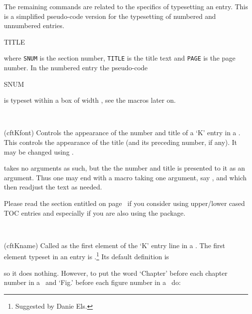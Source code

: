  The remaining commands are related to the specifics of typesetting
 an entry.
 This is a simplified pseudo-code version for the typesetting of numbered 
 and unnumbered entries.
 \begin{lcode}
 {}
         {\cftKleader}{}\cftKafterpnum\par

 {\cftKfont TITLE}{\cftKleader}{}\cftKafterpnum\par
 \end{lcode}
 where \texttt{SNUM} is the section number, \texttt{TITLE} is the title text 
and \texttt{PAGE} 
 is the page number. In the numbered entry the pseudo-code
\begin{lcode}
{\cftKpresnum SNUM\cftKaftersnum\hfil}
\end{lcode}
 is typeset within a box of width \lnc{\cftKnumwidth}, see the
  macros later on.

\begin{syntax}
\cmd{\cftKfont} \\
\end{syntax}
\glossary(cftKfont)%
{}%
{Controls the appearance of the number and title of a `K' entry in a \listofx.}
This controls the appearance of the title (and its preceding number, 
if any). It may be changed using \cmd{\renewcommand}. 

\cmd{\cftKfont} takes no arguments as such, but the the number and
title is presented to it as an argument. Thus one may end
\cmd{\cftKfont} with a macro taking one argument, say
\cmd{\MakeUppercase}, and which then readjust the text as needed.

\begin{caveat}
  Please read the section entitled
  \emph{} on
  page~\pageref{sec:about-upper-or} if you consider using upper/lower
  cased TOC entries and especially if you are also using the
   package.
\end{caveat}


\begin{syntax}
\cmd{\cftKname} \\
\end{syntax}
\glossary(cftKname)
  {}%
  {Called as the first element of the  `K' entry line in a \listofx.}
    The first element typeset in an entry is 
\cmd{\cftKname}.\footnote{Suggested by Danie Els.}
Its default definition is 
\begin{lcode}
\newcommand*{\cftKname}{}
\end{lcode}
so it does nothing. However, to put the word `Chapter' before each chapter 
number in a \toc\ and `Fig.' before each figure number in a \lof\ do:
\begin{lcode}
\renewcommand*{\cftchaptername}{Chapter\space}
\renewcommand*{\cftfigurename}{Fig.\space}
\end{lcode}

